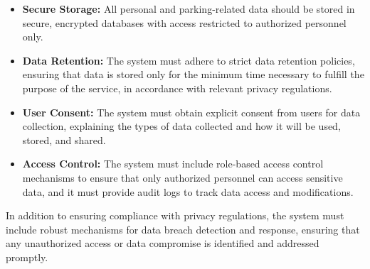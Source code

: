 \begin{itemize}
	\item \textbf{Secure Storage:} All personal and parking-related data should be stored in secure, encrypted databases with access restricted to authorized personnel only.
	\item \textbf{Data Retention:} The system must adhere to strict data retention policies, ensuring that data is stored only for the minimum time necessary to fulfill the purpose of the service, in accordance with relevant privacy regulations.
	\item \textbf{User Consent:} The system must obtain explicit consent from users for data collection, explaining the types of data collected and how it will be used, stored, and shared.
	\item \textbf{Access Control:} The system must include role-based access control mechanisms to ensure that only authorized personnel can access sensitive data, and it must provide audit logs to track data access and modifications.
\end{itemize}

In addition to ensuring compliance with privacy regulations, the system must include robust mechanisms for data breach detection and response, ensuring that any unauthorized access or data compromise is identified and addressed promptly.
